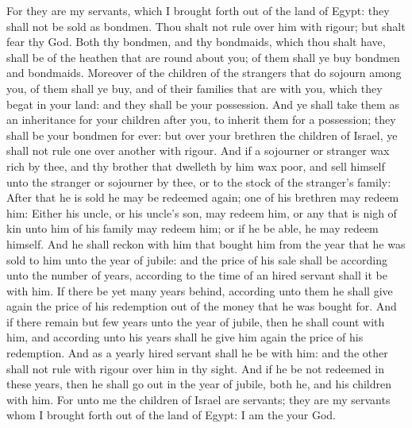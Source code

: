 \begin{biblechapter}
\verse For they are my servants, which I brought forth out of the land of Egypt: they shall not be sold as bondmen.
\verse Thou shalt not rule over him with rigour; but shalt fear thy God.
\verse Both thy bondmen, and thy bondmaids, which thou shalt have, shall be of the heathen that are round about you; of them shall ye buy bondmen and bondmaids.
\verse Moreover of the children of the strangers that do sojourn among you, of them shall ye buy, and of their families that are with you, which they begat in your land: and they shall be your possession.
\verse And ye shall take them as an inheritance for your children after you, to inherit them for a possession; they shall be your bondmen for ever: but over your brethren the children of Israel, ye shall not rule one over another with rigour.
\verse And if a sojourner or stranger wax rich by thee, and thy brother that dwelleth by him wax poor, and sell himself unto the stranger or sojourner by thee, or to the stock of the stranger's family:
\verse After that he is sold he may be redeemed again; one of his brethren may redeem him:
\verse Either his uncle, or his uncle's son, may redeem him, or any that is nigh of kin unto him of his family may redeem him; or if he be able, he may redeem himself.
\verse And he shall reckon with him that bought him from the year that he was sold to him unto the year of jubile: and the price of his sale shall be according unto the number of years, according to the time of an hired servant shall it be with him.
\verse If there be yet many years behind, according unto them he shall give again the price of his redemption out of the money that he was bought for.
\verse And if there remain but few years unto the year of jubile, then he shall count with him, and according unto his years shall he give him again the price of his redemption.
\verse And as a yearly hired servant shall he be with him: and the other shall not rule with rigour over him in thy sight.
\verse And if he be not redeemed in these years, then he shall go out in the year of jubile, both he, and his children with him.
\verse For unto me the children of Israel are servants; they are my servants whom I brought forth out of the land of Egypt: I am the \LORD your God.
\end{biblechapter}

